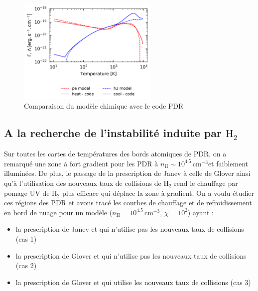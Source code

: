 \begin{figure}[!h]
    \centering \includegraphics[trim = {0 0 0 0cm},clip,width=0.6\textwidth]{figure/H2/pic/model.png}
    \caption{Comparaison du modèle chimique avec le code PDR}
    \label{fig:H2:meca:chim}
\end{figure}

\subsection{A la recherche de l'instabilité induite par $\mathrm{H}_2$}
Sur toutes les cartes de températures des bords atomiques de PDR, on a remarqué une zone à fort gradient pour les PDR à $n_\mathrm{H} \sim 10^{4.5}\,\mathrm{cm}^{-3}$et faiblement illuminées. De plus, le passage de la prescription de Janev à celle de Glover ainsi qu'à l'utilisation des nouveaux taux de collisions de $\mathrm{H}_2$ rend le chauffage par pomage UV de $\mathrm{H}_2$ plus efficace qui déplace la zone à gradient. On a voulu étudier ces régions des PDR et avons tracé les courbes de chauffage et de refroidissement en bord de nuage pour un modèle ($n_\mathrm{H} = 10^{4.5}\,\mathrm{cm}^{-3}$, $\chi = 10^2$) ayant :
\begin{itemize}
    \item la prescription de Janev et qui n'utilise pas les nouveaux taux de collisions (cas 1)
    \item la prescription de Glover et qui n'utilise pas les nouveaux taux de collisions (cas 2)
    \item la prescription de Glover et qui utilise les nouveaux taux de collisions (cas 3)
\end{itemize}

